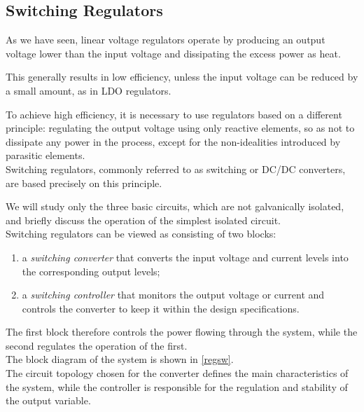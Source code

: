 \documentclass[../main.tex]{subfiles}
\begin{document}
\subsection{Switching Regulators}


As we have seen, linear voltage regulators operate by producing an output voltage lower than the input voltage and dissipating the excess power as heat. 

This generally results in low efficiency, unless the input voltage can be reduced by a small amount, as in LDO regulators.

To achieve high efficiency, it is necessary to use regulators based on a different principle: regulating the output voltage using only reactive elements, so as not to dissipate any power in the process, except for the non-idealities introduced by parasitic elements.\\

Switching regulators, commonly referred to as switching or DC/DC converters, are based precisely on this principle. 

We will study only the three basic circuits, which are not galvanically isolated, and briefly discuss the operation of the simplest isolated circuit.\\

Switching regulators can be viewed as consisting of two blocks:

\begin{enumerate}[label=\textbf{-}]
	\item a \textit{switching converter} that converts the input voltage and current levels into the corresponding output levels;
	\item a \textit{switching controller} that monitors the output voltage or current and controls the converter to keep it within the design specifications.
\end{enumerate}

The first block therefore controls the power flowing through the system, while the second regulates the operation of the first.\\

The block diagram of the system is shown in \autoref{regsw}.\\

The circuit topology chosen for the converter defines the main characteristics of the system, while the controller is responsible for the regulation and stability of the output variable.
\end{document}
